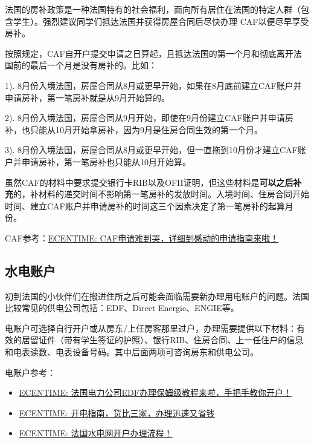 法国的房补政策是一种法国特有的社会福利，面向所有居住在法国的特定人群（包含学生）。强烈建议同学们抵达法国并获得房屋合同后尽快办理 CAF以便尽早享受房补。

按照规定，CAF自开户提交申请之日算起，且抵达法国的第一个月和彻底离开法国前的最后一个月是没有房补的。比如：

1). 8月份入境法国，房屋合同从8月或更早开始，如果在8月底前建立CAF账户并申请房补，第一笔房补就是从9月开始算的。 

2). 8月份入境法国，房屋合同从9月开始，即使在9月份建立CAF账户并申请房补，也只能从10月开始拿房补，因为9月是住房合同生效的第一个月。 

3). 8月份入境法国，房屋合同从8月或更早开始，但一直拖到10月份才建立CAF账户并申请房补，第一笔房补也只能从10月开始算。

虽然CAF的材料中要求提交银行卡RIB以及OFII证明，但这些材料是\textbf{可以之后补充}的，补材料的递交时间不影响第一笔房补的发放时间。入境时间、住房合同开始时间、建立CAF账户并申请房补的时间这三个因素决定了第一笔房补的起算月份。

CAF参考：\href{https://www.ecentime.com/article/demande-caf}{ECENTIME: CAF申请难到哭，详细到感动的申请指南来啦！}
 
\subsection{水电账户}

初到法国的小伙伴们在搬进住所之后可能会面临需要新办理用电账户的问题。法国比较常见的供电公司包括：EDF、Direct Energie、ENGIE等。

电账户可选择自行开户或从房东/上任房客那里过户，办理需要提供以下材料：有效的居留证件（带有学生签证的护照）、银行RIB、住房合同、上一任住户的信息和电表读数、电表设备号码。其中后面两项可咨询房东和供电公司。

电账户参考：
\begin{itemize}
    \item \href{https://www.ecentime.com/article/edf}{ECENTIME: 法国电力公司EDF办理保姆级教程来啦，手把手教你开户！}
    
    \item \href{https://www.ecentime.com/article/guide-electricite-comparaison-prix-bas}{ECENTIME: 开电指南，货比三家，办理迅速又省钱}
    
    \item \href{https://www.ecentime.com/article/edf-box-internet}{ECENTIME: 法国水电网开户办理流程！}
\end{itemize}

